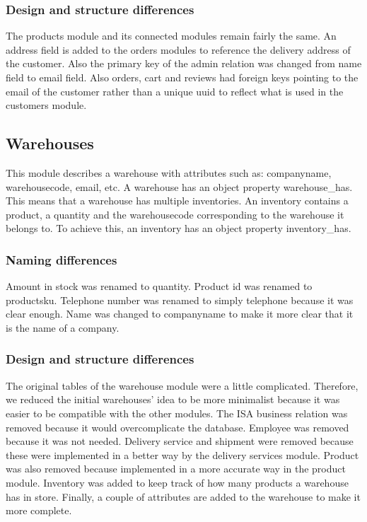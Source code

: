 \documentclass{article}
\begin{document}
\subsubsection{Design and structure differences}
The products module and its connected modules remain fairly the same. An address field is added to the orders modules to reference the delivery address of the customer. Also the primary key of the admin relation was changed from name field to email field. Also orders, cart and reviews had foreign keys pointing to the email of the customer rather than a unique uuid to reflect what is used in the customers module.


\subsection{Warehouses}
This module describes a warehouse with attributes such as: companyname, warehousecode, email, etc. A warehouse has an object property warehouse\_has. This means that a warehouse has multiple inventories. An inventory contains a product, a quantity and the warehousecode corresponding to the warehouse it belongs to. To achieve this, an inventory has an object property inventory\_has.


\subsubsection{Naming differences}
Amount in stock was renamed to quantity. Product id was renamed to productsku. Telephone number was renamed to simply telephone because it was clear enough. Name was changed to companyname to make it more clear that it is the name of a company.


\subsubsection{Design and structure differences}
The original tables of the warehouse module were a little complicated. Therefore, we reduced the initial warehouses' idea to be more minimalist because it was easier to be compatible with the other modules. The ISA business relation was removed because it would overcomplicate the database. Employee was removed because it was not needed. Delivery service and shipment were removed because these were implemented in a better way by the delivery services module. Product was also removed because implemented in a more accurate way in the product module. Inventory was added to keep track of how many products a warehouse has in store. Finally, a couple of attributes are added to the warehouse to make it more complete.
\end{document}
